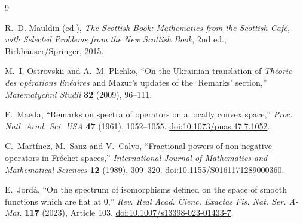 \documentclass[11pt]{article}
\theoremstyle{remark}
\begin{document}
\begin{thebibliography}{9}

R.~D. Mauldin (ed.),
\emph{The Scottish Book: Mathematics from the Scottish Caf\'e, with Selected Problems from the New Scottish Book},
2nd ed., Birkh\"auser/Springer, 2015.

M.~I. Ostrovskii and A.~M. Plichko,
``On the Ukrainian translation of \emph{Th\'eorie des op\'erations lin\'eaires} and Mazur's updates of the `Remarks' section,''
\emph{Matematychni Studii} \textbf{32} (2009), 96--111.

F.~Maeda,
``Remarks on spectra of operators on a locally convex space,''
\emph{Proc. Natl. Acad. Sci. USA} \textbf{47} (1961), 1052--1055.
\href{https://doi.org/10.1073/pnas.47.7.1052}{doi:10.1073/pnas.47.7.1052}.

C.~Mart\'inez, M.~Sanz and V.~Calvo,
``Fractional powers of non-negative operators in Fr\'echet spaces,''
\emph{International Journal of Mathematics and Mathematical Sciences} \textbf{12} (1989), 309--320.
\href{https://doi.org/10.1155/S0161171289000360}{doi:10.1155/S0161171289000360}.

E.~Jord\'a,
``On the spectrum of isomorphisms defined on the space of smooth functions which are flat at 0,''
\emph{Rev. Real Acad. Cienc. Exactas Fis. Nat. Ser. A-Mat.} \textbf{117} (2023), Article 103.
\href{https://doi.org/10.1007/s13398-023-01433-7}{doi:10.1007/s13398-023-01433-7}.

\end{thebibliography}
\end{document}
